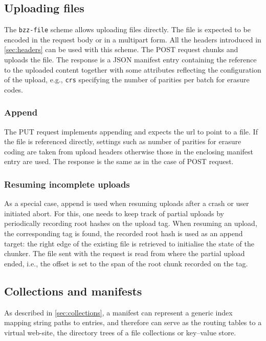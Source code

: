 \subsection{Uploading files}\label{sec:file-api}

The \texttt{bzz-file} scheme allows uploading files directly. The file is expected to be encoded in the request body or in a multipart form. All the headers introduced  in \ref{sec:headers} can be used with this scheme. The POST request chunks and uploads the file. The response is a JSON manifest entry containing the reference to the  uploaded content together with some attributes reflecting the configuration of the upload, e.g., \texttt{crs} specifying the number of parities per batch for erasure codes.

\subsubsection{Append}\label{sec:append}

The PUT request implements appending and expects the url to point to a file. If the file is referenced directly, settings such as number of parities for erasure coding are taken from upload headers otherwise those in the enclosing manifest entry are used. The response is the same as in the case of POST request.


\subsubsection{Resuming incomplete uploads}\label{sec:resume}

As a special case, append is used when resuming uploads after a crash or user initiated abort. For this, one needs to keep track of partial uploads by periodically recording root hashes on the upload tag. When resuming an upload, the corresponding tag is found, the recorded root hash is used as an append target: the right edge of the existing file is retrieved to initialise the state of the chunker. The file sent with the request is read from where the partial upload ended, i.e., the offset is set to the span of the root chunk recorded on the tag.

\subsection{Collections and manifests}\label{sec:manifests-ux}

As described in \ref{sec:collections}, a manifest  can represent a generic index mapping string paths to entries, and therefore can serve as the routing tables to a virtual web-site, the directory trees of a file collections or key--value store. 

